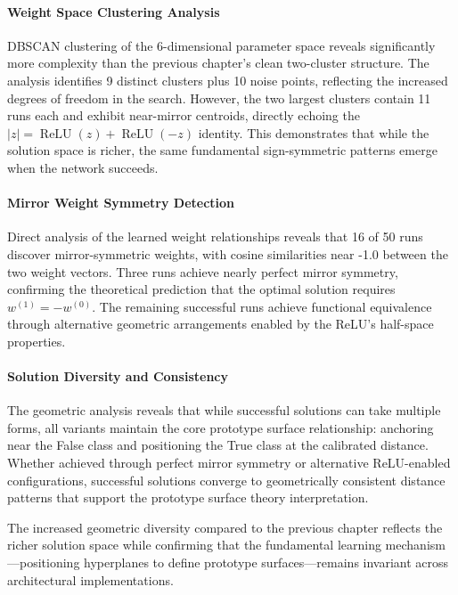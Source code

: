 \paragraph{Weight Space Clustering Analysis}
DBSCAN clustering of the 6-dimensional parameter space reveals significantly more complexity than the previous chapter's clean two-cluster structure. The analysis identifies 9 distinct clusters plus 10 noise points, reflecting the increased degrees of freedom in the search. However, the two largest clusters contain 11 runs each and exhibit near-mirror centroids, directly echoing the $|z| = \operatorname{ReLU}(z) + \operatorname{ReLU}(-z)$ identity. This demonstrates that while the solution space is richer, the same fundamental sign-symmetric patterns emerge when the network succeeds.

\paragraph{Mirror Weight Symmetry Detection}
Direct analysis of the learned weight relationships reveals that 16 of 50 runs discover mirror-symmetric weights, with cosine similarities near -1.0 between the two weight vectors. Three runs achieve nearly perfect mirror symmetry, confirming the theoretical prediction that the optimal solution requires $w^{(1)} = -w^{(0)}$. The remaining successful runs achieve functional equivalence through alternative geometric arrangements enabled by the ReLU's half-space properties.

\paragraph{Solution Diversity and Consistency}
The geometric analysis reveals that while successful solutions can take multiple forms, all variants maintain the core prototype surface relationship: anchoring near the False class and positioning the True class at the calibrated distance. Whether achieved through perfect mirror symmetry or alternative ReLU-enabled configurations, successful solutions converge to geometrically consistent distance patterns that support the prototype surface theory interpretation.

The increased geometric diversity compared to the previous chapter reflects the richer solution space while confirming that the fundamental learning mechanism—positioning hyperplanes to define prototype surfaces—remains invariant across architectural implementations.


